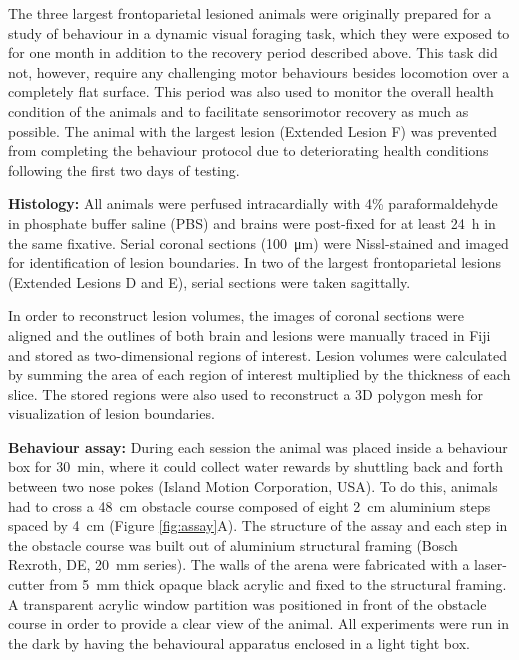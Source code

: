 The three largest frontoparietal lesioned animals were originally prepared for a study of behaviour in a dynamic visual foraging task, which they were exposed to for one month in addition to the recovery period described above. This task did not, however, require any challenging motor behaviours besides locomotion over a completely flat surface. This period was also used to monitor the overall health condition of the animals and to facilitate sensorimotor recovery as much as possible. The animal with the largest lesion (Extended Lesion F) was prevented from completing the behaviour protocol due to deteriorating health conditions following the first two days of testing.

\textbf{Histology:} All animals were perfused intracardially with 4\% paraformaldehyde in phosphate buffer saline (PBS) and brains were post-fixed for at least \SI{24}{\hour} in the same fixative. Serial coronal sections (\SI{100}{\micro\meter}) were Nissl-stained and imaged for identification of lesion boundaries. In two of the largest frontoparietal lesions (Extended Lesions D and E), serial sections were taken sagittally.

In order to reconstruct lesion volumes, the images of coronal sections were aligned and the outlines of both brain and lesions were manually traced in Fiji \cite{Schindelin2012} and stored as two-dimensional regions of interest. Lesion volumes were calculated by summing the area of each region of interest multiplied by the thickness of each slice. The stored regions were also used to reconstruct a 3D polygon mesh for visualization of lesion boundaries.

\textbf{Behaviour assay:} During each session the animal was placed inside a behaviour box for \SI{30}{\minute}, where it could collect water rewards by shuttling back and forth between two nose pokes (Island Motion Corporation, USA). To do this, animals had to cross a \SI{48}{\centi\meter} obstacle course composed of eight \SI{2}{\centi\meter} aluminium steps spaced by \SI{4}{\centi\meter} (Figure \ref{fig:assay}A). The structure of the assay and each step in the obstacle course was built out of aluminium structural framing (Bosch Rexroth, DE, \SI{20}{\milli\meter} series). The walls of the arena were fabricated with a laser-cutter from \SI{5}{\milli\meter} thick opaque black acrylic and fixed to the structural framing. A transparent acrylic window partition was positioned in front of the obstacle course in order to provide a clear view of the animal. All experiments were run in the dark by having the behavioural apparatus enclosed in a light tight box.

